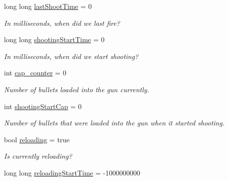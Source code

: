 \begin{DoxyCompactItemize}
\mbox{\label{class_gun_a68b19bf7fac97972a129c662f808b422}} 
long long \mbox{\hyperlink{class_gun_a68b19bf7fac97972a129c662f808b422}{last\+Shoot\+Time}} = 0
\begin{DoxyCompactList}\small\item\em In milliseconds, when did we last fire? \end{DoxyCompactList}\item 
\mbox{\label{class_gun_a31c19d64860897955b110ebd0b727f12}} 
long long \mbox{\hyperlink{class_gun_a31c19d64860897955b110ebd0b727f12}{shooting\+Start\+Time}} = 0
\begin{DoxyCompactList}\small\item\em In milliseconds, when did we start shooting? \end{DoxyCompactList}\item 
\mbox{\label{class_gun_af48329b2921fc4512da4be651f78eeee}} 
int \mbox{\hyperlink{class_gun_af48329b2921fc4512da4be651f78eeee}{cap\+\_\+counter}} = 0
\begin{DoxyCompactList}\small\item\em Number of bullets loaded into the gun currently. \end{DoxyCompactList}\item 
\mbox{\label{class_gun_a5d85506c83eab37832803f0e9146c0a4}} 
int \mbox{\hyperlink{class_gun_a5d85506c83eab37832803f0e9146c0a4}{shooting\+Start\+Cap}} = 0
\begin{DoxyCompactList}\small\item\em Number of bullets that were loaded into the gun when it started shooting. \end{DoxyCompactList}\item 
\mbox{\label{class_gun_a526c7b4ec167c5f55848a49b2a2f75cb}} 
bool \mbox{\hyperlink{class_gun_a526c7b4ec167c5f55848a49b2a2f75cb}{reloading}} = true
\begin{DoxyCompactList}\small\item\em Is currently reloading? \end{DoxyCompactList}\item 
\mbox{\label{class_gun_aa8e3f09299b79fec860ea137c020237b}} 
long long \mbox{\hyperlink{class_gun_aa8e3f09299b79fec860ea137c020237b}{reloading\+Start\+Time}} = -\/1000000000

\end{DoxyCompactItemize}

